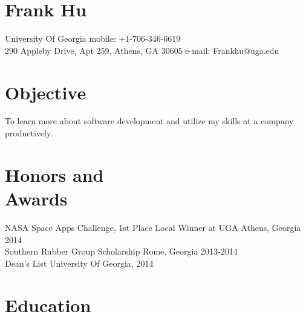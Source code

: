 \documentclass[margin,line]{resume}
\begin{document}
\section{\Large Frank Hu}
   	University Of Georgia      \hfill mobile: +1-706-346-6619          \vspace{0mm}\\\vspace{0mm}%
   290 Appleby Drive, Apt 259, Athens, GA 30605 \hfill e-mail: Frankhu@uga.edu \vspace{0mm}\\\vspace{-4.5mm}%

\begin{resume}

 
  \section{\mysidestyle Objective}

    To learn more about software development and utilize my skills at a company productively. 
    \section{\mysidestyle Honors and\\Awards} 

   NASA Space Apps Challenge, 1st Place Local Winner at UGA \hfill Athens, Georgia 2014\\%
   Southern Rubber Group Scholarship \hfill Rome, Georgia 2013-2014\\%
   Dean's List \hfill University Of Georgia, 2014
    \section{\mysidestyle Education}


\end{resume}
\end{document}
